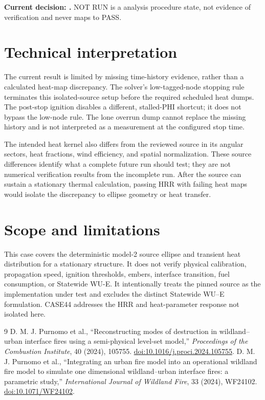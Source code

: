 

\textbf{Current decision: \VerificationStatus.}  NOT RUN is a analysis procedure state,
not evidence of verification and never maps to PASS.

\section{Technical interpretation}

The current result is limited by missing time-history evidence, rather than a
calculated heat-map discrepancy. The solver's low-tagged-node stopping rule
terminates this isolated-source setup before the required scheduled heat dumps.
The post-stop ignition disables a different, stalled-PHI shortcut; it does not
bypass the low-node rule. The lone overrun dump cannot replace the missing
history and is not interpreted as a measurement at the configured stop time.

The intended heat kernel also differs from the reviewed source in its angular
sectors, heat fractions, wind efficiency, and spatial normalization. These
source differences identify what a complete future run should test; they are
not numerical verification results from the incomplete run. After the source
can sustain a stationary thermal calculation, passing HRR with failing heat
maps would isolate the discrepancy to ellipse geometry or heat transfer.

\section{Scope and limitations}

This case covers the deterministic model-2 source ellipse and transient heat
distribution for a stationary structure.  It does not verify physical
calibration, propagation speed, ignition thresholds, embers, interface
transition, fuel consumption, or Statewide WU-E.  It intentionally treats
the pinned source as the implementation under test and excludes the distinct
Statewide WU--E formulation. CASE44 addresses the
HRR and heat-parameter response not isolated here.

\begin{thebibliography}{9}
 D. M. J. Purnomo et al., ``Reconstructing modes of destruction in wildland--urban interface fires using a semi-physical level-set model,'' \emph{Proceedings of the Combustion Institute}, 40 (2024), 105755. \href{https://doi.org/10.1016/j.proci.2024.105755}{doi:10.1016/j.proci.2024.105755}.
 D. M. J. Purnomo et al., ``Integrating an urban fire model into an operational wildland fire model to simulate one dimensional wildland--urban interface fires: a parametric study,'' \emph{International Journal of Wildland Fire}, 33 (2024), WF24102. \href{https://doi.org/10.1071/WF24102}{doi:10.1071/WF24102}.
\end{thebibliography}
